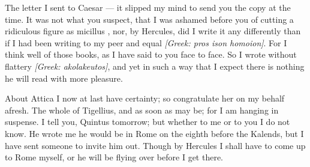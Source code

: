 

 The letter I sent to Caesar --- it slipped my mind to send you the copy at the time. It was not what you suspect, that I was ashamed before you of cutting a ridiculous figure as \dag micillus \dag, nor, by Hercules, did I write it any differently than if I had been writing to my peer and equal \textit{[Greek: pros ison homoion]}. For I think well of those books, as I have said to you face to face. So I wrote without flattery \textit{[Greek: akolakeutos]}, and yet in such a way that I expect there is nothing he will read with more pleasure.

 About Attica I now at last have certainty; so congratulate her on my behalf afresh. The whole of Tigellius, and as soon as may be; for I am hanging in suspense. I tell you, Quintus tomorrow; but whether to me or to you I do not know. He wrote me he would be in Rome on the eighth before the Kalends, but I have sent someone to invite him out. Though by Hercules I shall have to come up to Rome myself, or he will be flying over before I get there.
